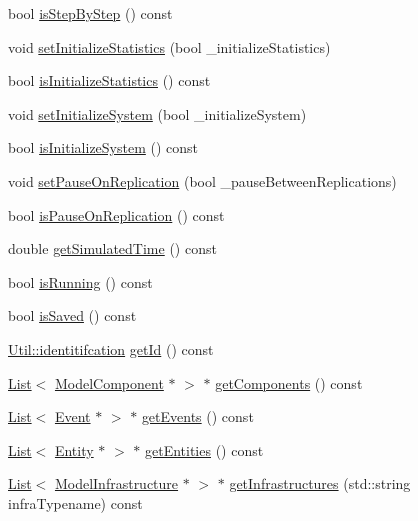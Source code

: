 \begin{DoxyCompactItemize}
bool \hyperlink{class_model_a8bc24806234d057bedb4262ecc090bf0}{is\-Step\-By\-Step} () const 
\item 
void \hyperlink{class_model_a2fe72bb622b3d75479822f68710a36c7}{set\-Initialize\-Statistics} (bool \-\_\-initialize\-Statistics)
\item 
bool \hyperlink{class_model_aefe1365d9a032fe1ac62991f45446d6a}{is\-Initialize\-Statistics} () const 
\item 
void \hyperlink{class_model_ac1299b28921f4d246319b2624e4ad98f}{set\-Initialize\-System} (bool \-\_\-initialize\-System)
\item 
bool \hyperlink{class_model_afd5e0285a55278e266045112ef795868}{is\-Initialize\-System} () const 
\item 
void \hyperlink{class_model_ae1f205bd8b328b3785694567eaeb77ef}{set\-Pause\-On\-Replication} (bool \-\_\-pause\-Between\-Replications)
\item 
bool \hyperlink{class_model_a269e5b3c45f3c7ce606205fec8f0b3b4}{is\-Pause\-On\-Replication} () const 
\item 
double \hyperlink{class_model_a74eb096b8229aa036d11adeeb8787599}{get\-Simulated\-Time} () const 
\item 
bool \hyperlink{class_model_a597bdaa89e9b6b396bded780e6d32fdf}{is\-Running} () const 
\item 
bool \hyperlink{class_model_a8d47ce2750e22e14e5249b724cdf4fd3}{is\-Saved} () const 
\item 
\hyperlink{class_util_ad17d458d9344b10bba64347e514d6d71}{Util\-::identitifcation} \hyperlink{class_model_abfd7753d30de6abea64b3f0846e097eb}{get\-Id} () const 
\item 
\hyperlink{class_list}{List}$<$ \hyperlink{class_model_component}{Model\-Component} $\ast$ $>$ $\ast$ \hyperlink{class_model_ae5773d78fc47cb35be7fbeb74b7d63e4}{get\-Components} () const 
\item 
\hyperlink{class_list}{List}$<$ \hyperlink{class_event}{Event} $\ast$ $>$ $\ast$ \hyperlink{class_model_a841c78bda0eb27c652c6921094dc5921}{get\-Events} () const 
\item 
\hyperlink{class_list}{List}$<$ \hyperlink{class_entity}{Entity} $\ast$ $>$ $\ast$ \hyperlink{class_model_ae09e777b481981772818ea3fd2880c4c}{get\-Entities} () const 
\item 
\hyperlink{class_list}{List}$<$ \hyperlink{class_model_infrastructure}{Model\-Infrastructure} $\ast$ $>$ $\ast$ \hyperlink{class_model_a43ca6ff93bd0b9fbc4c2792962e6b4ed}{get\-Infrastructures} (std\-::string infra\-Typename) const 

\end{DoxyCompactItemize}
